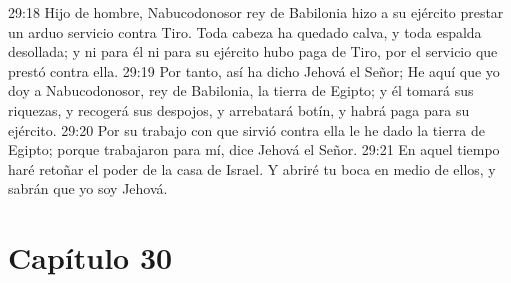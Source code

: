 29:18 Hijo de hombre, Nabucodonosor rey de Babilonia hizo a su ejército prestar un arduo servicio contra Tiro. Toda cabeza ha quedado calva, y toda espalda desollada; y ni para él ni para su ejército hubo paga de Tiro, por el servicio que prestó contra ella.   
29:19 Por tanto, así ha dicho Jehová el Señor; He aquí que yo doy a Nabucodonosor, rey de Babilonia, la tierra de Egipto; y él tomará sus riquezas, y recogerá sus despojos, y arrebatará botín, y habrá paga para su ejército.   
29:20 Por su trabajo con que sirvió contra ella le he dado la tierra de Egipto; porque trabajaron para mí, dice Jehová el Señor.   
29:21 En aquel tiempo haré retoñar el poder de la casa de Israel. Y abriré tu boca en medio de ellos, y sabrán que yo soy Jehová.   
\section*{Capítulo 30  }
  

